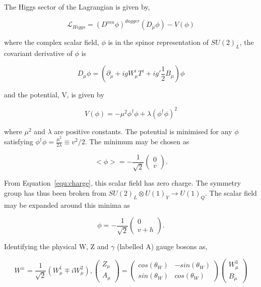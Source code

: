 The Higgs sector of the Lagrangian is given by,

\begin{equation}
\label{equ:higgs-lagrangian}
\mathcal{L}_{Higgs} = (D^{mu}\phi)^{dagger}(D_{\mu}\phi) - V(\phi)
\end{equation}

where the complex scalar field, $\phi$ is in the spinor representation of $SU(2)_L$, the covariant derivative of $\phi$ is

\begin{equation}
D_{\mu} \phi = (\partial_\mu + igW^i_{\mu}T^i + ig'\frac{1}{2}B_\mu)\phi 
\end{equation}

and the potential, V, is given by

\begin{equation}
V(\phi) =  - \mu^2\phi^{\dagger}\phi + \lambda \left(\phi^{\dagger}\phi\right)^2
\end{equation}

where $\mu^2$ and $\lambda$ are positive constants. The potential is minimised for any $\phi$ satisfying
$\phi^{\dagger}\phi = \frac{\mu^2}{2\lambda} \equiv v^2/2$. The minimum may be chosen as

\begin{equation}
<\phi> =  - \frac{1}{\sqrt{2}}\begin{pmatrix} 0 \\ v\end{pmatrix}.
\end{equation}

From Equation~\ref{equ:charge}, this scalar field has zero charge. The symmetry group has thus been broken from
$SU(2)_L\otimes U(1)_Y \rightarrow U(1)_Q$. The scalar field may be expanded around this minima as

\begin{equation}
\label{equ:phiExp}
\phi =  - \frac{1}{\sqrt{2}}\begin{pmatrix} 0 \\ v + h\end{pmatrix}.
\end{equation}

Identifying the physical W, Z and $\gamma$ (labelled A) gauge bosons as,

\begin{equation}
W^{\pm} = \frac{1}{\sqrt{2}} (W^1_\mu \mp i W^2_\mu), \begin{pmatrix} Z_\mu \\ A_\mu\end{pmatrix} = \begin{pmatrix} cos(\theta_W) & -sin(\theta_W) \\ sin(\theta_W) & cos(\theta_W)\end{pmatrix} \begin{pmatrix} W^3_\mu \\ B_\mu\end{pmatrix}
\end{equation}

